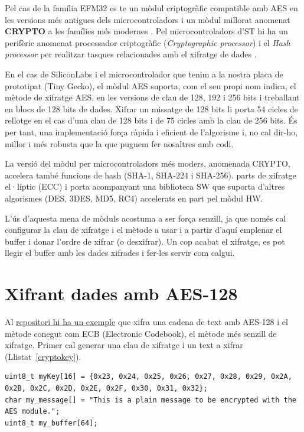 Pel cas de la família EFM32 es te un mòdul criptogràfic compatible amb AES en les versions més antigues dels microcontroladors i un mòdul millorat anomenat {\bf CRYPTO} a les famílies més modernes \cite[453]{EFM32TGRM}. Pel microcontroladors d'ST hi ha un perifèric anomenat processador criptogràfic ({\em Cryptographic processor}) i el {\em Hash processor} per realitzar tasques relacionades amb el xifratge de dades \cite[720]{STM32F4RM}.

En el cas de SiliconLabs i el microcontrolador que tenim a la nostra placa de prototipat (Tiny Gecko), el mòdul AES suporta, com el seu propi nom indica, el mètode de xifratge AES, en les versions de clau de 128, 192 i 256 bits i treballant en blocs de 128 bits de dades. Xifrar un missatge de 128 bits li porta 54 cicles de rellotge en el cas d'una clau de 128 bits i de 75 cicles amb la clau de 256 bits. És per tant, una implementació força ràpida i eficient de l'algorisme i, no cal dir-ho, millor i més robusta que la que puguem fer nosaltres amb codi.

La versió del mòdul per microcontroladors més moders, anomenada CRYPTO, accelera també funcions de hash (SHA-1, SHA-224 i SHA-256). parts de xifratge el·líptic (ECC) i porta acompanyant una biblioteca SW que suporta d'altres algorismes (DES, 3DES, MD5, RC4) accelerats en part pel mòdul HW.

L'ús d'aquesta mena de mòduls acostuma a ser força senzill, ja que només cal configurar la clau de xifratge i el mètode a usar i a partir d'aquí emplenar el buffer i donar l'ordre de xifrar (o desxifrar). Un cop acabat el xifratge, es pot llegir el buffer amb les dades xifrades i fer-les servir com calgui.

\section{Xifrant dades amb AES-128}

Al \href{https://github.com/mariusmm/cursembedded/tree/master/Simplicity/AES_1}{repositori hi ha un exemple} que xifra una cadena de text amb AES-128 i el mètode conegut com ECB (Electronic Codebook), el mètode més senzill de xifratge. Primer cal generar una clau de xifratge i un text a xifrar (Llistat~\ref{cryptokey}).
\begin{lstlisting}[style=customc,caption=Clau i text a xifrar,label=cryptokey]
uint8_t myKey[16] = {0x23, 0x24, 0x25, 0x26, 0x27, 0x28, 0x29, 0x2A, 0x2B, 0x2C, 0x2D, 0x2E, 0x2F, 0x30, 0x31, 0x32};
char my_message[] = "This is a plain message to be encrypted with the AES module.";
uint8_t my_buffer[64];
\end{lstlisting}

